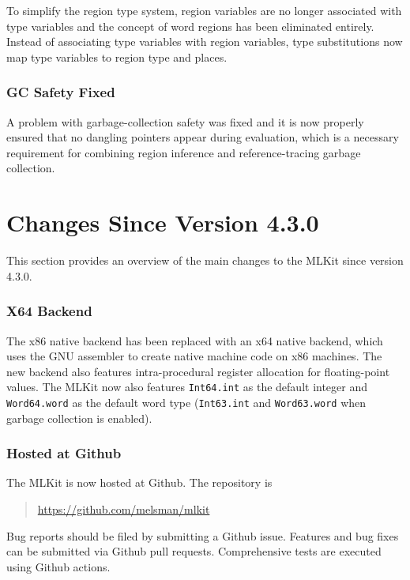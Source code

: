 \documentclass[12pt]{book}
\begin{document}
To simplify the region type system, region variables are no longer
associated with type variables and the concept of word regions has
been eliminated entirely. Instead of associating type variables with
region variables, type substitutions now map type variables to region
type and places.

\subsubsection*{GC Safety Fixed}

A problem with garbage-collection safety was fixed and it is now
properly ensured that no dangling pointers appear during evaluation,
which is a necessary requirement for combining region inference and
reference-tracing garbage collection.

\section{Changes Since Version 4.3.0}
%
This section provides an overview of the main changes to the MLKit
since version 4.3.0.

\subsubsection*{X64 Backend}
The
%
%
%
x86 native backend has been replaced with an
%
%
%
x64 native backend, which uses the GNU assembler to create native
machine code on x86 machines. The new backend also features
intra-procedural register allocation for floating-point values. The
MLKit now also features \texttt{Int64.int} as the default integer and
\texttt{Word64.word} as the default word type (\texttt{Int63.int} and
\texttt{Word63.word} when garbage collection is enabled).

\subsubsection*{Hosted at Github}
%
%
%
%
The MLKit is now hosted at Github. The repository is
\begin{quote}
  \url{https://github.com/melsman/mlkit}
\end{quote}
%
%
%
%
Bug reports should be filed by submitting a Github issue. Features and
bug fixes can be submitted via Github pull requests. Comprehensive
tests are executed  using Github actions.
\end{document}
